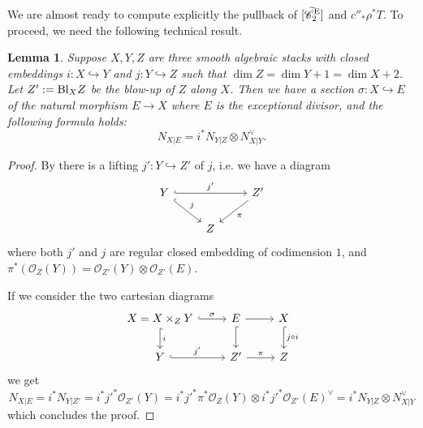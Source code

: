 \documentclass[a4paper, 10pt]{amsart}
\numberwithin{equation}{section}
\numberwithin{subsection}{section}
\newtheorem{lemma}[theorem]{Lemma}
\theoremstyle{definition}
\theoremstyle{remark}
\renewcommand{\mathcal}{\mathscr}
\newcommand\cO{\mathcal{O}} \newcommand\cP{\mathcal{P}}
\newcommand{\Ctilde}{\widetilde{\mathcal C}}
\begin{document}
	We are almost ready to compute explicitly the pullback of $[\Ctilde^{\rm E}_2]$ and $c''_*\rho^*T$.
	To proceed, we need the following technical result.
	\begin{lemma}\label{lm:blowup formula}
		Suppose $X,Y,Z$ are three smooth algebraic stacks with closed embeddings $i:X \hookrightarrow Y$ and $j: Y \hookrightarrow Z$ such that $\dim Z= \dim Y +1= \dim X +2$. Let $Z':= {\rm Bl}_{X}Z$ be the blow-up of $Z$ along $X$. Then we have a section  $\sigma:X \hookrightarrow E$ of the natural morphism $E\rightarrow X$ where $E$ is the exceptional divisor, and the following formula holds:
		$$ N_{X\vert E} = i^*N_{Y\vert Z}\otimes N_{X\vert Y}^\vee. $$
	\end{lemma}
	\begin{proof}
	    By \cite[B.6.10]{Ful} there is a lifting $j':Y \hookrightarrow Z'$ of $j$, i.e. we have a diagram
		$$\begin{tikzcd}
			Y \arrow[rr, "j'", hook] \arrow[rd, "j", hook] &   & Z' \arrow[ld, "\pi"] \\
			& Z &                     
		\end{tikzcd}$$ 
		where both $j'$ and $j$ are regular closed embedding of codimension $1$, and $ \pi^*(\cO_Z(Y))= \cO_{Z'}(Y) \otimes \cO_{Z'}(E) $. 
		
		If we consider the two cartesian diagrams
		$$\begin{tikzcd}
			X=X\times_Z Y \arrow[r, "\sigma", hook] \arrow[d, "i", hook] & E \arrow[r] \arrow[d, hook] & X \arrow[d, "j\circ i", hook] \\
			Y \arrow[r, "j'", hook]                                      & Z' \arrow[r,"\pi"]                  & Z                            
		\end{tikzcd}$$
		we get 
		$$ N_{X\vert E}= i^*N_{Y\vert Z'}= i^*j'^*\cO_{Z'}(Y)= i^*j'^*\pi^*\cO_Z(Y) \otimes i^*j'^*\cO_{Z'}(E)^\vee=i^*N_{Y\vert Z} \otimes N_{X\vert Y}^\vee$$
		which concludes the proof.
	\end{proof}
	
\end{document}
